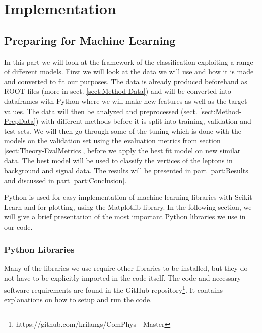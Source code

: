 \documentclass[a4paper, american, 12pt]{report}
\begin{document}

	\part{Implementation}
	\label{part:Implementation}
	
	\chapter{Preparing for Machine Learning}
	\label{chap:Method-Methods}
	In this part we will look at the framework of the classification exploiting a range of different models. First we will look at the data we will use and how it is made and converted to fit our purposes. The data is already produced beforehand as ROOT files (more in sect. \ref{sect:Method-Data}) and will be converted into dataframes with Python where we will make new features as well as the target values. The data will then be analyzed and preprocessed (sect. \ref{sect:Method-PrepData}) with different methods before it is split into training, validation and test sets. We will then go through some of the tuning which is done with the models on the validation set using the evaluation metrics from section \ref{sect:Theory-EvalMetrics}, before we apply the best fit model on new similar data. The best model will be used to classify the vertices of the leptons in background and signal data. The results will be presented in part \ref{part:Results} and discussed in part \ref{part:Conclusion}.
	
	Python is used for easy implementation of machine learning libraries with Scikit-Learn\cite{scikit-learn} and for plotting, using the Matplotlib library. In the following section, we will give a brief presentation of the most important Python libraries we use in our code.
	
	
	\section{Python Libraries}
	\label{sect:Method-Packages}
	Many of the libraries we use require other libraries to be installed, but they do not have to be explicitly imported in the code itself. The code and necessary software requirements are found in the GitHub repository\footnote{https://github.com/krilangs/ComPhys---Master}. It contains explanations on how to setup and run the code.
	
\end{document}
